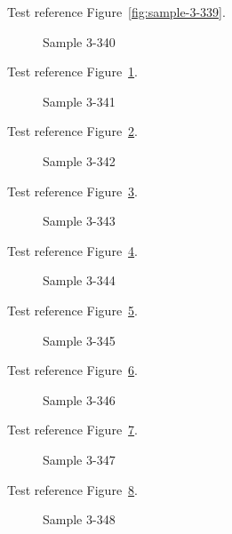 Test reference Figure~\ref{fig:sample-3-339}.

\begin{figure}[tbhp]
\caption{Sample 3-340}
\label{fig:sample-3-340}
\end{figure}

Test reference Figure~\ref{fig:sample-3-340}.

\begin{figure}[tbhp]
\caption{Sample 3-341}
\label{fig:sample-3-341}
\end{figure}

Test reference Figure~\ref{fig:sample-3-341}.

\begin{figure}[tbhp]
\caption{Sample 3-342}
\label{fig:sample-3-342}
\end{figure}

Test reference Figure~\ref{fig:sample-3-342}.

\begin{figure}[tbhp]
\caption{Sample 3-343}
\label{fig:sample-3-343}
\end{figure}

Test reference Figure~\ref{fig:sample-3-343}.

\begin{figure}[tbhp]
\caption{Sample 3-344}
\label{fig:sample-3-344}
\end{figure}

Test reference Figure~\ref{fig:sample-3-344}.

\begin{figure}[tbhp]
\caption{Sample 3-345}
\label{fig:sample-3-345}
\end{figure}

Test reference Figure~\ref{fig:sample-3-345}.

\begin{figure}[tbhp]
\caption{Sample 3-346}
\label{fig:sample-3-346}
\end{figure}

Test reference Figure~\ref{fig:sample-3-346}.

\begin{figure}[tbhp]
\caption{Sample 3-347}
\label{fig:sample-3-347}
\end{figure}

Test reference Figure~\ref{fig:sample-3-347}.

\begin{figure}[tbhp]
\caption{Sample 3-348}
\label{fig:sample-3-348}
\end{figure}

